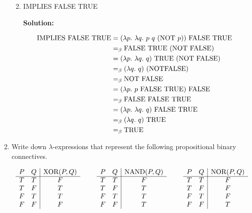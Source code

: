 \documentclass[11pt]{report}
\begin{document}
\begin{enumerate}
\begin{enumerate}
			\newpage
			\item IMPLIES FALSE TRUE
			
			{\bf Solution:}

			\begin{align*}
				\IMP \ \FALSE \ \TRUE &= (\lambda p. \ \lambda q. \ p \ q \ (\NOT \ p)) \ \FALSE \ \TRUE \\
				&\beq \FALSE \ \TRUE \ (\NOT \ \FALSE) \\
				&= (\lambda p. \ \lambda q. \ q) \ \TRUE \ (\NOT \ \FALSE) \\ 
				&\beq (\lambda q. \ q) \ (\NOT \FALSE) \\
				&\beq \NOT \ \FALSE \\
				&= (\lambda p. \ p \ \FALSE \ \TRUE) \ \FALSE \\ 
				&\beq \FALSE \ \FALSE \ \TRUE \\
				&= (\lambda p. \ \lambda q. \ q) \ \FALSE \ \TRUE \\
				&\beq (\lambda q. \ q) \ \TRUE \\
				&\beq \TRUE				
			\end{align*} 

		\end{enumerate} 
	
	\newpage
	\item Write down $\lambda$-expressions that represent the following propositional binary connectives.
			
	\vspace{0.5cm}

	\begin{center}
		$\begin{array}{c c c}

			\begin{array}{ c c | c }			
				P & Q & \text{XOR}(P,Q)\\
				\cline{1 - 3}
				T & T & F \\ 
				T & F & T \\ 
				F & T & T \\ 
				F & F & F
			\end{array} 
			& \hspace{0.5cm}
			\begin{array}{ c c | c }			
				P & Q & \text{NAND}(P,Q)\\
				\cline{1 - 3}
				T & T & F \\ 
				T & F & T \\ 
				F & T & T \\ 
				F & F & T
			\end{array} 
			& \hspace{0.5cm}
			\begin{array}{ c c | c }			
				P & Q & \text{NOR}(P,Q)\\
				\cline{1 - 3}
				T & T & F \\ 
				T & F & F \\ 
				F & T & F \\ 
				F & F & T
			\end{array} 
		\end{array}$
	\end{center}
	

\end{enumerate}
\end{document}
